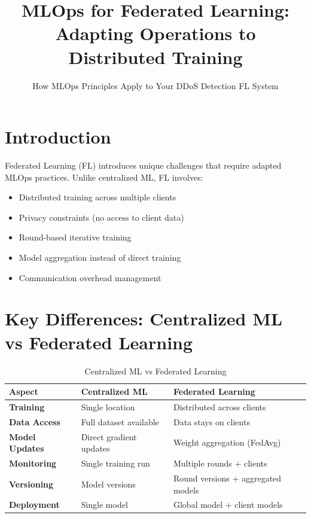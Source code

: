 \documentclass[12pt]{article}
\title{MLOps for Federated Learning: Adapting Operations to Distributed Training}
\subtitle{How MLOps Principles Apply to Your DDoS Detection FL System}
\author{}
\date{}
\begin{document}
\maketitle

\section{Introduction}

Federated Learning (FL) introduces unique challenges that require adapted MLOps practices. Unlike centralized ML, FL involves:
\begin{itemize}
    \item Distributed training across multiple clients
    \item Privacy constraints (no access to client data)
    \item Round-based iterative training
    \item Model aggregation instead of direct training
    \item Communication overhead management
\end{itemize}

\section{Key Differences: Centralized ML vs Federated Learning}

\begin{table}[h]
\centering
\begin{tabular}{|l|l|l|}
\hline
\textbf{Aspect} & \textbf{Centralized ML} & \textbf{Federated Learning} \\
\hline
\textbf{Training} & Single location & Distributed across clients \\
\hline
\textbf{Data Access} & Full dataset available & Data stays on clients \\
\hline
\textbf{Model Updates} & Direct gradient updates & Weight aggregation (FedAvg) \\
\hline
\textbf{Monitoring} & Single training run & Multiple rounds + clients \\
\hline
\textbf{Versioning} & Model versions & Round versions + aggregated models \\
\hline
\textbf{Deployment} & Single model & Global model + client models \\
\hline
\end{tabular}
\caption{Centralized ML vs Federated Learning}
\end{table}
\end{document}
